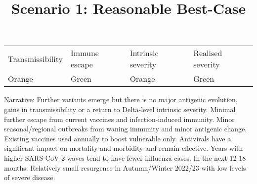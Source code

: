 \documentclass{article}
\begin{document}
\title{Scenario 1: Reasonable Best-Case}

\maketitle





\begin{tabu} to \textwidth { |X|X|X|X| }
\hline



Transmissibility   & Immune escape  & Intrinsic severity & Realised severity
 \\


Orange & Green & Orange & Green
 \\
\hline

\end{tabu}




Narrative: Further variants emerge but there is no major antigenic evolution, gains in transmissibility or a return to Delta-level intrinsic severity. Minimal further escape from current vaccines and infection-induced immunity. Minor seasonal/regional outbreaks from waning immunity and minor antigenic change. Existing vaccines used annually to boost vulnerable only. Antivirals have a significant impact on mortality and morbidity and remain effective. Years with higher SARS-CoV-2 waves tend to have fewer influenza cases. In the next 12-18 months: Relatively small resurgence in Autumn/Winter 2022/23 with low levels of severe disease.
\end{document}
